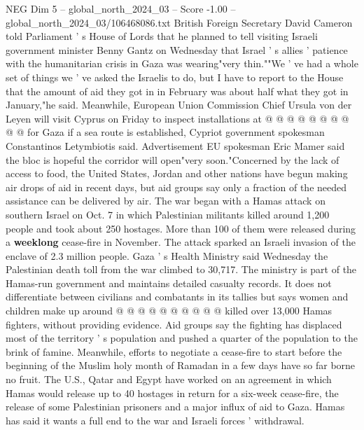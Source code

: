 \begin{textsample}{NEG Dim 5 – global\_north\_2024\_03 – Score -1.00 – global\_north\_2024\_03/106468086.txt}
British Foreign Secretary David Cameron told Parliament ' s House of Lords that he planned to tell visiting Israeli government minister Benny Gantz on Wednesday that Israel ' s allies ' patience with the humanitarian crisis in Gaza was wearing"very thin.""We ' ve had a whole set of things we ' ve asked the Israelis to do, but I have to report to the House that the amount of aid they got in in February was about half what they got in January,"he said.
Meanwhile, European Union Commission Chief Ursula von der Leyen will visit Cyprus on Friday to inspect installations at @ @ @ @ @ @ @ @ @ @ for Gaza if a sea route is established, Cypriot government spokesman Constantinos Letymbiotis said.
Advertisement EU spokesman Eric Mamer said the bloc is hopeful the corridor will open"very soon."Concerned by the lack of access to food, the United States, Jordan and other nations have begun making air drops of aid in recent days, but aid groups say only a fraction of the needed assistance can be delivered by air.
The war began with a Hamas attack on southern Israel on Oct. 7 in which Palestinian militants killed around 1,200 people and took about 250 hostages.
More than 100 of them were released during a \textbf{weeklong} cease-fire in November.
The attack sparked an Israeli invasion of the enclave of 2.3 million people.
Gaza ' s Health Ministry said Wednesday the Palestinian death toll from the war climbed to 30,717.
The ministry is part of the Hamas-run government and maintains detailed casualty records.
It does not differentiate between civilians and combatants in its tallies but says women and children make up around @ @ @ @ @ @ @ @ @ @ killed over 13,000 Hamas fighters, without providing evidence.
Aid groups say the fighting has displaced most of the territory ' s population and pushed a quarter of the population to the brink of famine.
Meanwhile, efforts to negotiate a cease-fire to start before the beginning of the Muslim holy month of Ramadan in a few days have so far borne no fruit.
The U.S., Qatar and Egypt have worked on an agreement in which Hamas would release up to 40 hostages in return for a six-week cease-fire, the release of some Palestinian prisoners and a major influx of aid to Gaza.
Hamas has said it wants a full end to the war and Israeli forces ' withdrawal.

\end{textsample}
